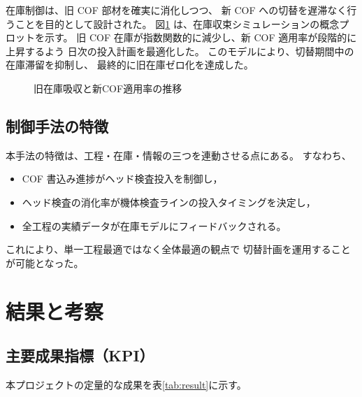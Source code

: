 \documentclass[journal,twocolumn]{IEEEtran}
\begin{document}
在庫制御は、旧 COF 部材を確実に消化しつつ、
新 COF への切替を遅滞なく行うことを目的として設計された。
図\ref{fig:inventory} は、在庫収束シミュレーションの概念プロットを示す。
旧 COF 在庫が指数関数的に減少し、新 COF 適用率が段階的に上昇するよう
日次の投入計画を最適化した。
このモデルにより、切替期間中の在庫滞留を抑制し、
最終的に旧在庫ゼロ化を達成した。

\begin{figure}[t]
\centering
{}
\caption{旧在庫吸収と新COF適用率の推移}
\label{fig:inventory}
\end{figure}

\subsection{制御手法の特徴}

本手法の特徴は、工程・在庫・情報の三つを連動させる点にある。
すなわち、
\begin{itemize}
  \item COF 書込み進捗がヘッド検査投入を制御し，
  \item ヘッド検査の消化率が機体検査ラインの投入タイミングを決定し，
  \item 全工程の実績データが在庫モデルにフィードバックされる。
\end{itemize}
これにより、単一工程最適ではなく全体最適の観点で
切替計画を運用することが可能となった。

\section{結果と考察}

\subsection{主要成果指標（KPI）}
本プロジェクトの定量的な成果を表\ref{tab:result}に示す。
\end{document}
